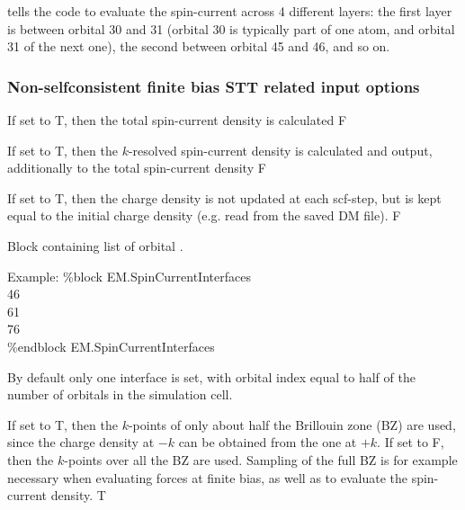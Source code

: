 \documentclass[11pt]{article}
\begin{document}
tells the code to evaluate the spin-current across 4 different layers: the first layer is between orbital 30 and 31 (orbital 30 is typically part of one atom, and orbital 31 of the next one), the second between orbital 45 and 46, and so on.



\subsubsection{Non-selfconsistent finite  bias STT related input options}

{If set to T, then the total spin-current density is calculated}
{F}

{If set to T, then the $k$-resolved spin-current density is calculated and output, additionally to the total spin-current density}
{F}

{If set to T, then the charge density is not updated at each scf-step, but is kept equal to the initial charge density (e.g. read from the saved DM file).}
{F}

%
%
%

{Block containing list of orbital .

\begin{flushleft}
Example:\linebreak
{\ttfamily
\%block EM.SpinCurrentInterfaces\\
46\\
61\\
76\\
\%endblock EM.SpinCurrentInterfaces}
\end{flushleft}}
{By default only one interface is set, with orbital index equal to half of the number of orbitals in the simulation cell.}

{If set to T, then the $k$-points of only about half the Brillouin zone (BZ) are used, since the charge density at $-k$ can be obtained from the one at $+k$. If set to F, then the $k$-points over all the BZ are used. Sampling of the full BZ is for example necessary when evaluating forces at finite bias, as well as to evaluate the spin-current density.}
{T}
\end{document}
